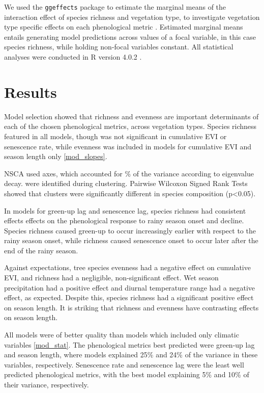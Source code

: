 \documentclass[11pt,a4paper]{article}
\begin{document}
We used the \texttt{ggeffects} package to estimate the marginal means of the interaction effect of species richness and vegetation type, to investigate vegetation type specific effects on each phenological metric \citep{ggefects}. Estimated marginal means entails generating model predictions across values of a focal variable, in this case species richness, while holding non-focal variables constant. All statistical analyses were conducted in R version 4.0.2 \citep{R2020}.

\section{Results}

Model selection showed that richness and evenness are important determinants of each of the chosen phenological metrics, across vegetation types. Species richness featured in all models, though was not significant in cumulative EVI or senescence rate, while evenness was included in models for cumulative EVI and season length only \autoref{mod_slopes}. 

NSCA used \nscaAxes{} axes, which accounted for \nscaInertia{}\% of the variance according to eigenvalue decay. \nCluster{} were identified during clustering. Pairwise Wilcoxon Signed Rank Tests showed that clusters were significantly different in species composition (p<0.05). 

In models for green-up lag and senescence lag, species richness had consistent effects effects on the phenological response to rainy season onset and decline. Species richness caused green-up to occur increasingly earlier with respect to the rainy season onset, while richness caused senescence onset to occur later after the end of the rainy season.

Against expectations, tree species evenness had a negative effect on cumulative EVI, and richness had a negligible, non-significant effect. Wet season precipitation had a positive effect and diurnal temperature range had a negative effect, as expected. Despite this, species richness had a significant positive effect on season length. It is striking that richness and evenness have contrasting effects on season length.

All models were of better quality than models which included only climatic variables \autoref{mod_stat}. The phenological metrics best predicted were green-up lag and season length, where models explained 25\% and 24\% of the variance in these variables, respectively. Senescence rate and senescence lag were the least well predicted phenological metrics, with the best model explaining 5\% and 10\% of their variance, respectively.
\end{document}
